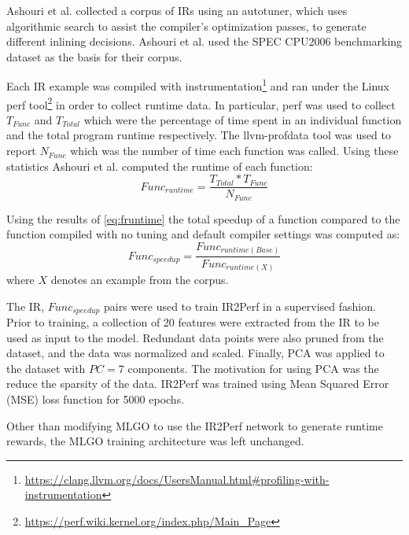 \documentclass[nohyperref]{article}
\theoremstyle{plain}
\theoremstyle{definition}
\theoremstyle{remark}
\begin{document}
Ashouri et al. collected a corpus of IRs using an autotuner, which uses algorithmic search to assist the compiler's optimization passes, to generate different inlining decisions. Ashouri et al. used the SPEC CPU2006 benchmarking dataset \cite{spec2006} as the basis for their corpus.

Each IR example was compiled with instrumentation\footnote{\href{https://clang.llvm.org/docs/UsersManual.html\#profiling-with-instrumentation}{https://clang.llvm.org/docs/UsersManual.html\#profiling-with-instrumentation}} and ran under the Linux perf tool\footnote{\href{https://perf.wiki.kernel.org/index.php/Main\_Page}{https://perf.wiki.kernel.org/index.php/Main\_Page}} in order to collect runtime data. In particular, perf was used to collect $T_{Func}$ and $T_{Total}$ which were the percentage of time spent in an individual function and the total program runtime respectively. The llvm-profdata tool was used to report $N_{Func}$ which was the number of time each function was called. Using these statistics Ashouri et al. computed the runtime of each function:
\begin{equation} \label{eq:fruntime}
    Func_{runtime} = \frac{T_{Total} * T_{Func}}{N_{Func}}
\end{equation}

Using the results of \ref{eq:fruntime} the total speedup of a function compared to the function compiled with no tuning and default compiler settings was computed as:
\begin{equation}
    Func_{speedup} = \frac{Func_{runtime(Base)}}{Func_{runtime(X)}}
\end{equation}
where $X$ denotes an example from the corpus.

The IR, $Func_{speedup}$ pairs were used to train IR2Perf in a supervised fashion. Prior to training, a collection of 20 features were extracted from the IR to be used as input to the model. Redundant data points were also pruned from the dataset, and the data was normalized and scaled. Finally, PCA was applied to the dataset with $PC=7$ components. The motivation for using PCA was the reduce the sparsity of the data. IR2Perf was trained using Mean Squared Error (MSE) loss function for 5000 epochs.

Other than modifying MLGO to use the IR2Perf network to generate runtime rewards, the MLGO training architecture was left unchanged.

\end{document}
